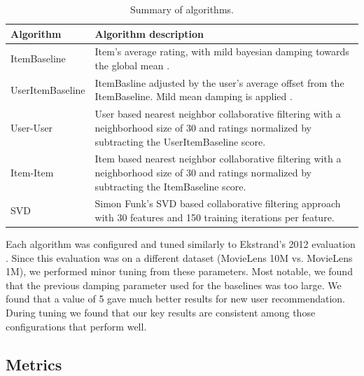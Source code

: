 \documentclass[letterpaper]{sig-alternate}
\begin{document}
  \begin{table}[ht!]
    \centering
    \begin{tabular}{|p{6em}|p{18em}|}
      \hline
      Algorithm          & Algorithm description \\\hline
      ItemBaseline       & Item's average rating, with mild bayesian damping towards the global mean \cite{funk_netflix_2006}. \\\hline
      UserItem\-Baseline & ItemBasline adjusted by the user's average offset from the ItemBaseline. Mild mean damping is applied \cite{funk_netflix_2006}. \\\hline
      User-User          & User based nearest neighbor collaborative filtering \cite{resnick1994grouplens} with a neighborhood size of 30 and ratings normalized by subtracting the UserItemBaseline score. \\\hline
      Item-Item          & Item based nearest neighbor collaborative filtering \cite{sarwar2001item} with a neighborhood size of 30 and ratings normalized by subtracting the ItemBaseline score.   \\\hline
      SVD                & Simon Funk's SVD based collaborative filtering approach \cite{funk_netflix_2006} with 30 features and 150 training iterations per feature. \\\hline
    \end{tabular}
    \caption{Summary of algorithms.}
    \label{tbl:algo}
  \end{table}
  
  Each algorithm was configured and tuned similarly to Ekstrand's 2012 evaluation \cite{ekstrand2012recommenders}.
  Since this evaluation was on a different dataset (MovieLens 10M vs. MovieLens 1M), we performed minor tuning from these parameters.
  Most notable, we found that the previous damping parameter used for the baselines was too large.
  We found that a value of 5 gave much better results for new user recommendation.
  During tuning we found that our key results are consistent among those configurations that perform well.


  \subsection*{Metrics}
\end{document}
